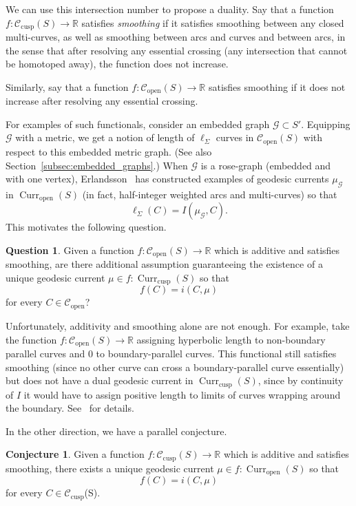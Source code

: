 \documentclass[11pt]{amsart}
\numberwithin{equation}{section}
\numberwithin{figure}{section}
\theoremstyle{definition}
\newtheorem{question}[theorem]{Question}
\newtheorem{conjecture}[theorem]{Conjecture}
\theoremstyle{plain}
\DeclareMathOperator{\Curr}{Curr}
\newcommand{\Curves}{\mathcal{C}}
\begin{document}
We can use this intersection number to propose a duality. Say that a
function $f \colon \Curves_{\mathrm{cusp}}(S) \to \mathbb{R}$
satisfies \emph{smoothing} if it satisfies smoothing between any
closed multi-curves, as well as smoothing between arcs and curves and
between arcs, in the sense that after resolving any essential crossing
(any intersection that cannot be homotoped away), the function does
not increase.

Similarly, say that a function
$f \colon \Curves_{\mathrm{open}}(S) \to \mathbb{R}$ satisfies
smoothing if it does not increase after resolving any essential
crossing.

For examples of such functionals, consider an embedded graph $\mathcal{G} \subset S'$.
Equipping $\mathcal{G}$ with a metric, we get a notion of length of
$\ell_\Sigma$ curves in $\Curves_{\mathrm{open}}(S)$ with respect to
this embedded metric graph. (See also
Section~\ref{subsec:embedded_graphs}.) When $\mathcal{G}$ is a rose-graph
(embedded and
with one vertex), Erlandsson~\cite{Erlandsson:WordLength} has
constructed examples of geodesic currents $\mu_{\mathcal{G}}$ in
$\Curr_{\mathrm{open}}(S)$ (in fact, half-integer weighted arcs and
multi-curves) so that
\[
\ell_{\Sigma}(C)=I(\mu_{\mathcal{G}}, C).
\]
This motivates the following question.

\begin{question}\label{quest:open-to-cusp}
Given a function $f \colon \Curves_{\mathrm{open}}(S) \to \mathbb{R}$
which is additive and satisfies smoothing, are there additional
assumption guaranteeing the existence of a unique geodesic current $\mu \in f \colon \Curr_{\mathrm{cusp}}(S)$ so that
\[
f(C)=i(C, \mu)
\]
for every $C \in \Curves_{\mathrm{open}}$?
\end{question}

Unfortunately, additivity and smoothing alone are not enough. For
example, take the function
$f \colon \Curves_{\mathrm{open}}(S) \to \mathbb{R}$ assigning
hyperbolic length to non-boundary parallel curves and $0$ to
boundary-parallel curves. This functional still satisfies smoothing
(since no other curve can cross a boundary-parallel curve essentially)
but does not have a dual geodesic current in
$\Curr_{\mathrm{cusp}}(S)$, since by continuity of $I$ it would have
to assign positive length to limits of curves wrapping around the
boundary. See~\cite[Remark~2.26]{MGT21:Smoothings} for details.

In the other direction, we have a parallel conjecture.

\begin{conjecture}\label{conj:cusp-to-open}
Given a function $f \colon \Curves_{\mathrm{cusp}}(S) \to \mathbb{R}$ which is additive and satisfies smoothing, there exists a unique geodesic current $\mu \in f \colon \Curr_{\mathrm{open}}(S)$ so that
\[
f(C)=i(C, \mu)
\]
for every $C \in \Curves_{\mathrm{cusp}}$(S).
\end{conjecture}
\end{document}
